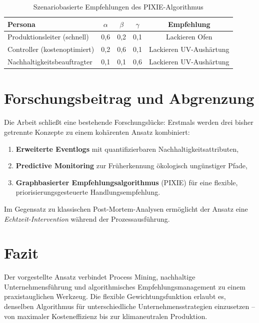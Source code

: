 \documentclass[12pt, a4paper]{article}
\begin{document}
\begin{table}[h]
  \centering
  \caption{Szenariobasierte Empfehlungen des PIXIE-Algorithmus}
  \label{tab:szenarien}
  \begin{tabular}{lcccc}
    \toprule
    Persona & $\alpha$ & $\beta$ & $\gamma$ & Empfehlung \\
    \midrule
    Produktionsleiter (schnell)   & 0{,}6 & 0{,}2 & 0{,}1 & Lackieren Ofen \\
    Controller (kostenoptimiert)  & 0{,}2 & 0{,}6 & 0{,}1 & Lackieren UV-Aushärtung \\
    Nachhaltigkeitsbeauftragter   & 0{,}1 & 0{,}1 & 0{,}6 & Lackieren UV-Aushärtung \\
    \bottomrule
  \end{tabular}
\end{table}

\section{Forschungsbeitrag und Abgrenzung}
\label{sec:beitrag}

Die Arbeit schließt eine bestehende Forschungslücke:
Erstmals werden drei bisher getrennte Konzepte zu einem
kohärenten Ansatz kombiniert:

\begin{enumerate}
  \item \textbf{Erweiterte Eventlogs} mit quantifizierbaren Nachhaltigkeitsattributen,
  \item \textbf{Predictive Monitoring} zur Früherkennung ökologisch ungünstiger Pfade,
  \item \textbf{Graphbasierter Empfehlungsalgorithmus} (PIXIE)
        für eine flexible, priorisierungsgesteuerte Handlungsempfehlung.
\end{enumerate}

Im Gegensatz zu klassischen Post-Mortem-Analysen
ermöglicht der Ansatz eine \emph{Echtzeit-Intervention}
während der Prozessausführung.

\section{Fazit}
\label{sec:fazit}

Der vorgestellte Ansatz verbindet Process Mining,
nachhaltige Unternehmensführung und algorithmisches Empfehlungsmanagement
zu einem praxistauglichen Werkzeug.
Die flexible Gewichtungsfunktion erlaubt es,
denselben Algorithmus für unterschiedliche Unternehmensstrategien einzusetzen --
von maximaler Kosteneffizienz bis zur klimaneutralen Produktion.

\printbibliography[heading=bibintoc]
\end{document}
